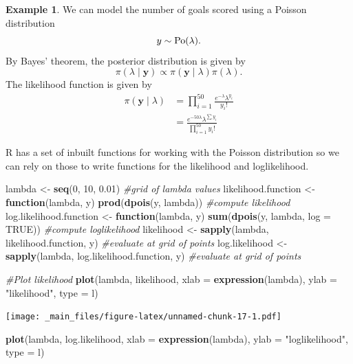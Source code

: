 \documentclass[
]{book}
\newenvironment{Shaded}{\begin{snugshade}}{\end{snugshade}}
\newcommand{\AttributeTok}[1]{\textcolor[rgb]{0.13,0.29,0.53}{#1}}
\newcommand{\CommentTok}[1]{\textcolor[rgb]{0.56,0.35,0.01}{\textit{#1}}}
\newcommand{\ConstantTok}[1]{\textcolor[rgb]{0.56,0.35,0.01}{#1}}
\newcommand{\ControlFlowTok}[1]{\textcolor[rgb]{0.13,0.29,0.53}{\textbf{#1}}}
\newcommand{\DecValTok}[1]{\textcolor[rgb]{0.00,0.00,0.81}{#1}}
\newcommand{\FloatTok}[1]{\textcolor[rgb]{0.00,0.00,0.81}{#1}}
\newcommand{\FunctionTok}[1]{\textcolor[rgb]{0.13,0.29,0.53}{\textbf{#1}}}
\newcommand{\NormalTok}[1]{#1}
\newcommand{\OtherTok}[1]{\textcolor[rgb]{0.56,0.35,0.01}{#1}}
\newcommand{\StringTok}[1]{\textcolor[rgb]{0.31,0.60,0.02}{#1}}
\theoremstyle{definition}
\theoremstyle{definition}
\newtheorem{example}{Example}[chapter]
\theoremstyle{definition}
\theoremstyle{definition}
\theoremstyle{remark}
\begin{document}
\begin{example}
We can model the number of goals scored using a Poisson distribution
\[
y \sim \hbox{Po}(\lambda).
\]
By Bayes' theorem, the posterior distribution is given by
\[
\pi(\lambda \mid \boldsymbol{y}) \propto \pi(\boldsymbol{y} \mid \lambda)\pi(\lambda). 
\]
The likelihood function is given by
\begin{align*}
\pi(\boldsymbol{y} \mid \lambda) &= \prod_{i=1}^{50} \frac{e^{-\lambda}\lambda^{y_i}}{y_i!}\\
&= \frac{e^{-50\lambda}\lambda^{\sum y_i}}{\prod_{i=1}^{50} y_i!} 
\end{align*}

R has a set of inbuilt functions for working with the Poisson distribution so we can rely on those to write functions for the likelihood and loglikelihood.

\begin{Shaded}
\begin{Highlighting}[]
\NormalTok{lambda }\OtherTok{\textless{}{-}} \FunctionTok{seq}\NormalTok{(}\DecValTok{0}\NormalTok{, }\DecValTok{10}\NormalTok{, }\FloatTok{0.01}\NormalTok{) }\CommentTok{\#grid of lambda values}
\NormalTok{likelihood.function }\OtherTok{\textless{}{-}} \ControlFlowTok{function}\NormalTok{(lambda, y) }\FunctionTok{prod}\NormalTok{(}\FunctionTok{dpois}\NormalTok{(y, lambda)) }\CommentTok{\#compute likelihood}
\NormalTok{log.likelihood.function  }\OtherTok{\textless{}{-}} \ControlFlowTok{function}\NormalTok{(lambda, y) }\FunctionTok{sum}\NormalTok{(}\FunctionTok{dpois}\NormalTok{(y, lambda, }\AttributeTok{log =} \ConstantTok{TRUE}\NormalTok{)) }\CommentTok{\#compute loglikelihood}
\NormalTok{likelihood }\OtherTok{\textless{}{-}} \FunctionTok{sapply}\NormalTok{(lambda,  likelihood.function, y) }\CommentTok{\#evaluate at grid of points}
\NormalTok{log.likelihood }\OtherTok{\textless{}{-}} \FunctionTok{sapply}\NormalTok{(lambda,  log.likelihood.function, y) }\CommentTok{\#evaluate at grid of points}

\CommentTok{\#Plot likelihood}
\FunctionTok{plot}\NormalTok{(lambda, likelihood, }
     \AttributeTok{xlab =} \FunctionTok{expression}\NormalTok{(lambda), }\AttributeTok{ylab =} \StringTok{"likelihood"}\NormalTok{, }\AttributeTok{type =} \StringTok{\textquotesingle{}l\textquotesingle{}}\NormalTok{)}
\end{Highlighting}
\end{Shaded}

\texttt{[image: \_main\_files/figure-latex/unnamed-chunk-17-1.pdf]}

\begin{Shaded}
\begin{Highlighting}[]
\FunctionTok{plot}\NormalTok{(lambda, log.likelihood, }
     \AttributeTok{xlab =} \FunctionTok{expression}\NormalTok{(lambda), }\AttributeTok{ylab =} \StringTok{"loglikelihood"}\NormalTok{, }\AttributeTok{type =} \StringTok{\textquotesingle{}l\textquotesingle{}}\NormalTok{)}
\end{Highlighting}
\end{Shaded}


\end{example}
\end{document}
